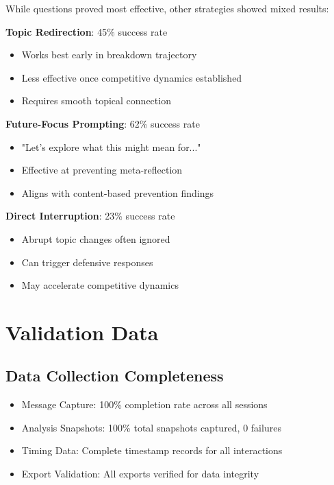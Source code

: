 \documentclass[11pt,letterpaper]{article}
\newcommand{\exponedataTotalSessionsRaw}{67}
\newcommand{\exptwoTotalSessionsRaw}{61}
\newcommand{\expthreeTotalSessionsRaw}{100}
\newcommand{\totalAllPhasesRaw}{\fpeval{\exponedataTotalSessionsRaw + \exptwoTotalSessionsRaw + \expthreeTotalSessionsRaw}}
\begin{document}
While questions proved most effective, other strategies showed mixed results:

\textbf{Topic Redirection}: 45\% success rate
\begin{itemize}
    \item Works best early in breakdown trajectory
    \item Less effective once competitive dynamics established
    \item Requires smooth topical connection
\end{itemize}

\textbf{Future-Focus Prompting}: 62\% success rate
\begin{itemize}
    \item "Let's explore what this might mean for..."
    \item Effective at preventing meta-reflection
    \item Aligns with content-based prevention findings
\end{itemize}

\textbf{Direct Interruption}: 23\% success rate
\begin{itemize}
    \item Abrupt topic changes often ignored
    \item Can trigger defensive responses
    \item May accelerate competitive dynamics
\end{itemize}

\section{Validation Data}
\label{app:performance}

\subsection{Data Collection Completeness}

\begin{itemize}
    \item Message Capture: 100\% completion rate across all sessions
    \item Analysis Snapshots: 100\% total snapshots captured, 0 failures
    \item Timing Data: Complete timestamp records for all interactions
    \item Export Validation: All \totalAllPhasesRaw{} exports verified for data integrity
\end{itemize}
\end{document}
